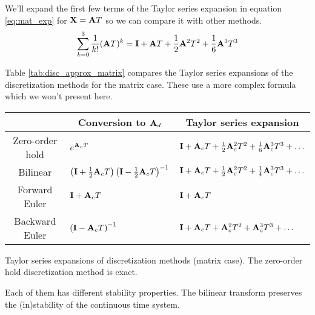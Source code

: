 We'll expand the first few terms of the Taylor series expansion in equation
\eqref{eq:mat_exp} for $\mathbf{X} = \mathbf{A}T$ so we can compare it with other
methods.
\begin{equation*}
  \sum_{k=0}^3 \frac{1}{k!} (\mathbf{A}T)^k = \mathbf{I} + \mathbf{A}T +
    \frac{1}{2}\mathbf{A}^2T^2 + \frac{1}{6}\mathbf{A}^3T^3
\end{equation*}

Table \ref{tab:disc_approx_matrix} compares the Taylor series expansions of the
\gls{discretization} methods for the matrix case. These use a more complex
formula which we won't present here.
\begin{booktable}
  \begin{tabular}{|cll|}
    \hline
    \rowcolor{headingbg}
    \multicolumn{1}{|c}{\textbf{Method}} &
      \multicolumn{1}{c}{\textbf{Conversion to $\mathbf{A}_d$}} &
      \multicolumn{1}{c|}{\textbf{Taylor series expansion}} \\
    \hline
    Zero-order hold &
      $e^{\mathbf{A}_c T}$ &
      $\mathbf{I} + \mathbf{A}_c T + \frac{1}{2}\mathbf{A}_c^2T^2 +
        \frac{1}{6}\mathbf{A}_c^3T^3 + \ldots$ \\
    Bilinear &
      $\left(\mathbf{I} + \frac{1}{2}\mathbf{A}_c T\right)
        \left(\mathbf{I} - \frac{1}{2}\mathbf{A}_c T\right)^{-1}$ &
      $\mathbf{I} + \mathbf{A}_c T + \frac{1}{2}\mathbf{A}_c^2T^2 +
        \frac{1}{4}\mathbf{A}_c^3T^3 + \ldots$ \\
    Forward Euler &
      $\mathbf{I} + \mathbf{A}_c T$ &
      $\mathbf{I} + \mathbf{A}_c T$ \\
    Backward Euler &
      $\left(\mathbf{I} - \mathbf{A}_c T\right)^{-1}$ &
      $\mathbf{I} + \mathbf{A}_c T + \mathbf{A}_c^2T^2 + \mathbf{A}_c^3T^3 + \ldots$ \\
    \hline
  \end{tabular}
  \caption{Taylor series expansions of discretization methods (matrix case).
    The zero-order hold discretization method is exact.}
  \label{tab:disc_approx_matrix}
\end{booktable}

Each of them has different stability properties. The bilinear transform
preserves the (in)stability of the continuous time \gls{system}.

